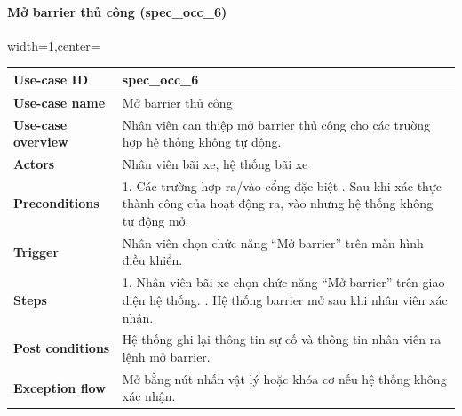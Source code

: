 \paragraph{Mở barrier thủ công  (spec\_occ\_6)}
\begin{adjustbox}{width=1\textwidth,center=\textwidth}
\small
\begin{tabular}{|>{\centering\arraybackslash}m{3.5cm}|m{13.2cm}|}
\hline
\textbf{Use-case ID} & spec\_occ\_6  \\ \hline
\textbf{Use-case name} & Mở barrier thủ công   \\ \hline
\textbf{Use-case overview} & Nhân viên can thiệp mở barrier thủ công cho các trường hợp hệ thống không tự động. \\ \hline
\textbf{Actors} & Nhân viên bãi xe, hệ thống bãi xe   \\ \hline
\textbf{Preconditions} &
1. Các trường hợp ra/vào cổng đặc biệt \newline
2. Sau khi xác thực thành công của hoạt động ra, vào nhưng hệ thống không tự động mở.
\\ \hline
\textbf{Trigger} & Nhân viên chọn chức năng “Mở barrier” trên màn hình điều khiển. \\ \hline
\textbf{Steps} & 
1. Nhân viên bãi xe chọn chức năng “Mở barrier” trên giao diện hệ thống. \newline
2. Hệ thống barrier mở sau khi nhân viên xác nhận. \\ \hline
\textbf{Post conditions} & Hệ thống ghi lại thông tin sự cố và thông tin nhân viên ra lệnh mở barrier. \\ \hline
\textbf{Exception flow} & Mở bằng nút nhấn vật lý hoặc khóa cơ nếu hệ thống không xác nhận. \\ \hline
\end{tabular}
\end{adjustbox}